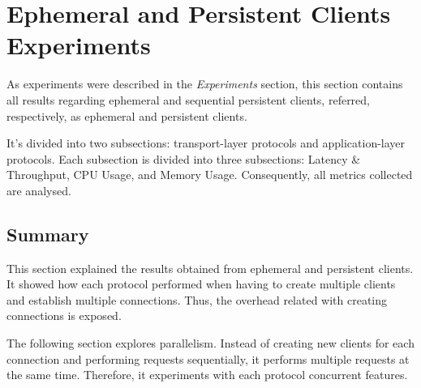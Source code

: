 \section{Ephemeral and Persistent Clients Experiments}

As experiments were described in the \textit{Experiments} section, this section contains all results regarding ephemeral and sequential persistent clients, referred, respectively, as ephemeral and persistent clients.

It's divided into two subsections: transport-layer protocols and application-layer protocols. Each subsection is divided into three subsections: Latency \& Throughput, CPU Usage, and Memory Usage. Consequently, all 
metrics collected are analysed.





\subsection{Summary}

This section explained the results obtained from ephemeral and persistent clients. It showed how each protocol performed when having to create multiple clients and establish multiple connections. Thus, the overhead related with creating connections is exposed.

The following section explores parallelism. Instead of creating new clients for each connection and performing requests sequentially, it performs multiple requests at the same time. Therefore, it experiments with each protocol concurrent features.
